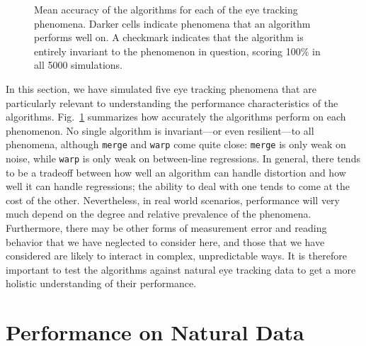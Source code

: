 \documentclass[doc,biblatex]{apa7}
\begin{document}
	\begin{figure}
	\vspace*{2pt}
	\caption{Mean accuracy of the algorithms for each of the eye tracking phenomena. Darker cells indicate phenomena that an algorithm performs well on. A checkmark indicates that the algorithm is entirely invariant to the phenomenon in question, scoring 100\% in all 5000 simulations.}
	\label{fig06}
	\end{figure}

In this section, we have simulated five eye tracking phenomena that are particularly relevant to understanding the performance characteristics of the algorithms. Fig.~\ref{fig06} summarizes how accurately the algorithms perform on each phenomenon. No single algorithm is invariant---or even resilient---to all phenomena, although \texttt{merge} and \texttt{warp} come quite close: \texttt{merge} is only weak on noise, while \texttt{warp} is only weak on between-line regressions. In general, there tends to be a tradeoff between how well an algorithm can handle distortion and how well it can handle regressions; the ability to deal with one tends to come at the cost of the other. Nevertheless, in real world scenarios, performance will very much depend on the degree and relative prevalence of the phenomena. Furthermore, there may be other forms of measurement error and reading behavior that we have neglected to consider here, and those that we have considered are likely to interact in complex, unpredictable ways. It is therefore important to test the algorithms against natural eye tracking data to get a more holistic understanding of their performance.

\section{Performance on Natural Data}
\end{document}
